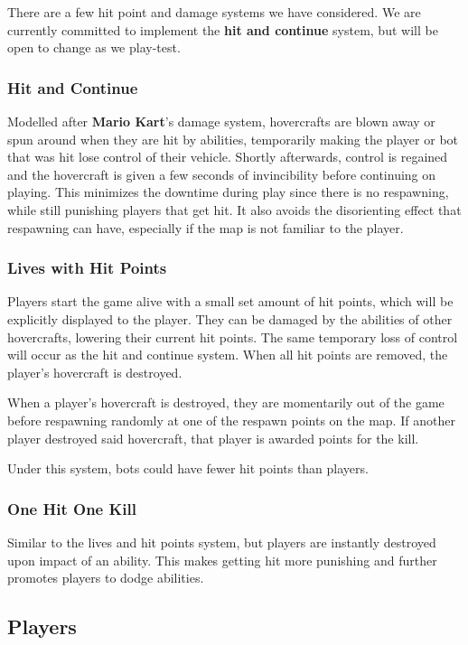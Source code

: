 \documentclass{article}
\theoremstyle{definition}
\begin{document}
There are a few hit point and damage systems we have considered. We are
currently committed to implement the \textbf{hit and continue} system, but will
be open to change as we play-test.

\subsubsection{Hit and Continue}

Modelled after \textbf{Mario Kart}'s damage system, hovercrafts are blown away or
spun around when they are hit by abilities, temporarily making the player or
bot that was hit lose control of their vehicle. Shortly afterwards, control is
regained and the hovercraft is given a few seconds of invincibility before
continuing on playing. This minimizes the downtime during play since there is
no respawning, while still punishing players that get hit. It also avoids the
disorienting effect that respawning can have, especially if the map is not
familiar to the player.

\subsubsection{Lives with Hit Points}

Players start the game alive with a small set amount of hit points, which will
be explicitly displayed to the player. They can be damaged by the abilities of
other hovercrafts, lowering their current hit points. The same temporary loss
of control will occur as the hit and continue system. When all hit points are
removed, the player's hovercraft is destroyed.

When a player's hovercraft is destroyed, they are momentarily out of the game
before respawning randomly at one of the respawn points on the map. If another
player destroyed said hovercraft, that player is awarded points for the kill.

Under this system, bots could have fewer hit points than players.

\subsubsection{One Hit One Kill}

Similar to the lives and hit points system, but players are instantly destroyed
upon impact of an ability. This makes getting hit more punishing and further
promotes players to dodge abilities.

\subsection{Players}
\end{document}

